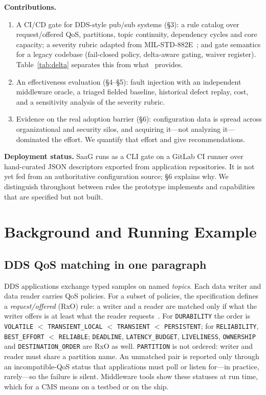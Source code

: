 \documentclass[sigconf,screen]{acmart}
\begin{document}
\noindent\textbf{Contributions.}
\begin{enumerate}
\item A CI/CD gate for DDS-style pub/sub systems (\S3): a rule catalog over request/offered QoS, partitions, topic continuity, dependency cycles and core capacity; a severity rubric adapted from MIL-STD-882E~\cite{milstd882e}; and gate semantics for a legacy codebase (fail-closed policy, delta-aware gating, waiver register). Table~\ref{tab:delta} separates this from what~\cite{yigit2025graph} provides.
\item An effectiveness evaluation (\S4--\S5): fault injection with an independent middleware oracle, a triaged fielded baseline, historical defect replay, cost, and a sensitivity analysis of the severity rubric.
\item Evidence on the real adoption barrier (\S6): configuration data is spread across organizational and security silos, and acquiring it---not analyzing it---dominated the effort. We quantify that effort and give recommendations.
\end{enumerate}

\noindent\textbf{Deployment status.} SaaG runs as a CLI gate on a GitLab CI runner over hand-curated JSON descriptors exported from application repositories. It is not yet fed from an authoritative configuration source; \S6 explains why. We distinguish throughout between rules the prototype implements and capabilities that are specified but not built.

\section{Background and Running Example}

\subsection{DDS QoS matching in one paragraph}
DDS applications exchange typed samples on named \emph{topics}. Each data writer and data reader carries QoS policies. For a subset of policies, the specification defines a \emph{request/offered} (RxO) rule: a writer and a reader are matched only if what the writer offers is at least what the reader requests~\cite{omg2015dds}. For \texttt{DURABILITY} the order is \texttt{VOLATILE} $<$ \texttt{TRANSIENT\_LOCAL} $<$ \texttt{TRANSIENT} $<$ \texttt{PERSISTENT}; for \texttt{RELIABILITY}, \texttt{BEST\_EFFORT} $<$ \texttt{RELIABLE}; \texttt{DEADLINE}, \texttt{LATENCY\_BUDGET}, \texttt{LIVELINESS}, \texttt{OWNERSHIP} and \texttt{DESTINATION\_ORDER} are RxO as well. \texttt{PARTITION} is not ordered: writer and reader must share a partition name. An unmatched pair is reported only through an incompatible-QoS status that applications must poll or listen for---in practice, rarely---so the failure is silent. Middleware tools show these statuses at run time, which for a CMS means on a testbed or on the ship.
\end{document}
